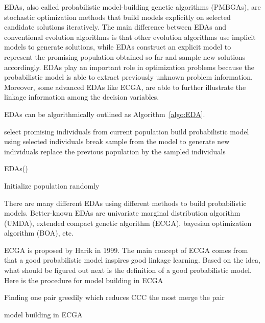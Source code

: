 EDAs, also called probabilistic model-building genetic algorithms
(PMBGAs), are stochastic optimization methods that build models
explicitly on selected candidate solutions iteratively.  The main
difference between EDAs and conventional evolution algorithms is that
other evolution algorithms use implicit models to generate solutions,
while EDAs construct an explicit model to represent the promising
population obtained so far and sample new solutions accordingly.  EDAs
play an important role in optimization problems because the
probabilistic model is able to extract previously unknown problem
information.  Moreover, some advanced EDAs like ECGA, are able to
further illustrate the linkage information among the decision variables.

EDAs can be algorithmically outlined as Algorithm~\ref{algo:EDA}.

\begin{algorithm}

  \label{algo:EDA}  { select
    promising individuals from current population\; build probabilistic
    model using selected individuals\;  { break\; }
    sample from the model to generate new individuals\; replace the
  previous population by the sampled	individuals\; } \caption {EDAs()}
  Initialize population randomly\; \end{algorithm}

There are many different EDAs using different methods to build
probabilistic models.  Better-known EDAs are univariate marginal
distribution algorithm (UMDA), extended compact genetic algorithm
(ECGA), bayesian optimization algorithm (BOA), etc.

ECGA is proposed by Harik in 1999.  The main concept of ECGA comes from
that a good probabilistic model inspires good linkage learning.  Based
on the idea, what should be figured out next is the definition of a good
probabilistic model.  Here is the procedure for model building in ECGA

\begin{algorithm}    { Finding one pair greedily which reduces CCC
    the most \; merge the pair\; } \caption{model building in ECGA}
  \end{algorithm}

